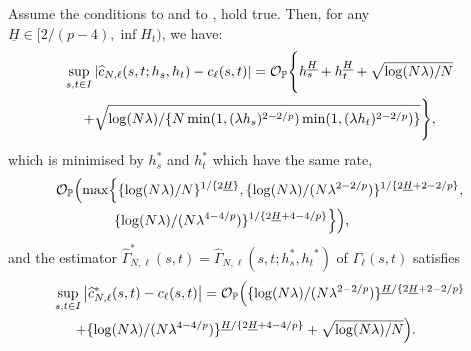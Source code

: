\documentclass{article}
\begin{document}
\medskip

\begin{theorem}\label{thm:autocov_unif_cv}
	Assume the conditions  to  and  to ,  hold true. 
	Then, for any $\underline{H}\in[2/(p-4),\inf H_t)$, we have:
	\begin{multline}
	\sup_{s,t \in I} \left|\widehat c_{N,\ell} (s,t;h_s,h_t) -  c_\ell (s,t)\right| =  \mathcal{O}_{\mathbb{P}}\Biggl\{h_s^{\underline{H}} + h_t^{\underline{H}} +\sqrt{\log(N\lambda) / N} \\ + \sqrt{\log(N \lambda) /\{N\min(1, (\lambda h_s)^{2-2/p})\min(1, (\lambda h_t)^{2-2/p})\}}  \Biggr\},
	\end{multline}
	which is minimised by $h_s^*$ and $h_t^*$ which have the same rate,
	\begin{multline*}
		\mathcal{O}_{\mathbb{P}}\Bigl( \max\Bigl\{\{\log(N \lambda) / N\}^{ 1 / \{2 \underline{H}\}}, \{\log(N \lambda) / (N\lambda^{2-2/p})\}^{ 1 / \{2 \underline{H}+2-2/p \}}, \\ \{\log(N \lambda) / (N\lambda^{4-4/p})\}^{1 / \{2 \underline{H}+4-4/p \}} \Bigr\} \Bigr), \qquad\qquad
	\end{multline*}
	and the estimator $\widehat{\Gamma}_{N,\ell}^*(s,t) = \widehat \Gamma_{N,\ell}(s, t;h_s^*,{h_t}^*) $ of $\Gamma_\ell (s,t)$ satisfies 
	\begin{multline*}
		\sup_{s,t \in I} \left|\widehat c_{N,\ell}^*(s,t) - c_\ell(s,t)\right|
		= \mathcal{O}_{\mathbb{P}}\Bigl( \{\log(N \lambda) / (N\lambda^{2-2/p})\}^{\underline{H} / \{2 \underline{H}+2-2/p \}} \\ + \{\log(N \lambda) / (N\lambda^{4-4/p})\}^{\underline{H} / \{2 \underline{H}+4-4/p \}} + \sqrt{\log(N\lambda)/N} \Bigr). \qquad
	\end{multline*}
\end{theorem}

\medskip
\end{document}
